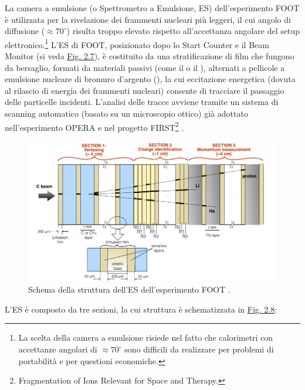 \documentclass[12pt,a4paper,twoside]{report}
\begin{document}
	La camera a emulsione (o Spettrometro a Emulsione, ES) dell'esperimento FOOT è utilizzata per la rivelazione dei frammenti nucleari più leggeri, il cui angolo di diffusione ($\approx70^\circ$) risulta troppo elevato rispetto all'accettanza angolare del setup elettronico.\footnote{La scelta della camera a emulsione risiede nel fatto che calorimetri con accettanze angolari di $\approx70^\circ$ sono difficili da realizzare per problemi di portabilità e per questioni economiche.} L'ES di FOOT, posizionato dopo lo Start Counter e il Beam Monitor (si veda \hyperref[fig:position_es]{Fig. 2.7}), è costituito da una stratificazione di film che fungono da bersaglio, formati da materiali passivi (come il  o il ), alternati a pellicole a emulsione nucleare di bromuro d'argento (), la cui eccitazione energetica (dovuta al rilascio di energia dei frammenti nucleari) consente di tracciare il passaggio delle particelle incidenti. L'analisi delle tracce avviene tramite un sistema di scanning automatico (basato su un microscopio ottico) già adottato nell'esperimento OPERA \cite{Armenise:2005yh,Arrabito:2006rv} e nel progetto FIRST\footnote{Fragmentation of Ions Relevant for Space and Therapy.} \cite{PhysRevC.93.064601}.
	\begin{figure}[H]
		\centering
		\includegraphics[width=0.9\linewidth]{structure_es.pdf}
		\caption{Schema della struttura dell'ES dell'esperimento FOOT \cite{foot_cdr}.}
		\label{fig:structure_es}
	\end{figure}
	L'ES è composto da tre sezioni, la cui struttura è schematizzata in \hyperref[fig:structure_es]{Fig. 2.8}:
\end{document}
